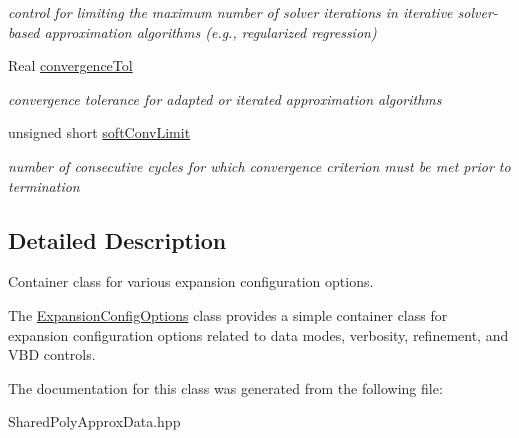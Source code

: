 \begin{DoxyCompactItemize}
\begin{DoxyCompactList}\small\item\em control for limiting the maximum number of solver iterations in iterative solver-\/based approximation algorithms (e.\+g., regularized regression) \end{DoxyCompactList}\item 
Real \hyperlink{classPecos_1_1ExpansionConfigOptions_adfa55b33af02e0710cef939a4b49c498}{convergence\+Tol}\label{classPecos_1_1ExpansionConfigOptions_adfa55b33af02e0710cef939a4b49c498}

\begin{DoxyCompactList}\small\item\em convergence tolerance for adapted or iterated approximation algorithms \end{DoxyCompactList}\item 
unsigned short \hyperlink{classPecos_1_1ExpansionConfigOptions_aa5315f8c8b2844fb38b15f8a8884a34d}{soft\+Conv\+Limit}\label{classPecos_1_1ExpansionConfigOptions_aa5315f8c8b2844fb38b15f8a8884a34d}

\begin{DoxyCompactList}\small\item\em number of consecutive cycles for which convergence criterion must be met prior to termination \end{DoxyCompactList}\end{DoxyCompactItemize}


\subsection{Detailed Description}
Container class for various expansion configuration options. 

The \hyperlink{classPecos_1_1ExpansionConfigOptions}{Expansion\+Config\+Options} class provides a simple container class for expansion configuration options related to data modes, verbosity, refinement, and V\+BD controls. 

The documentation for this class was generated from the following file\+:\begin{DoxyCompactItemize}
\item 
Shared\+Poly\+Approx\+Data.\+hpp\end{DoxyCompactItemize}
